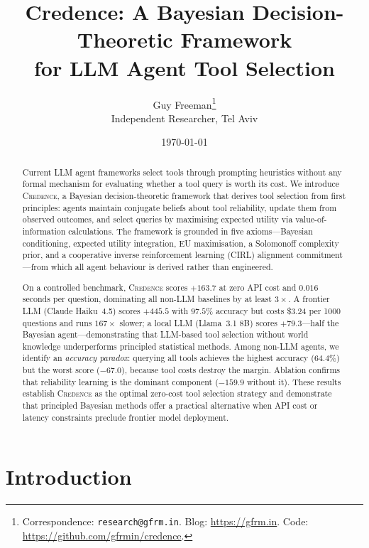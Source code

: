 \documentclass[11pt]{article}
\title{Credence: A Bayesian Decision-Theoretic Framework \\for LLM Agent Tool Selection}
\author{
  Guy Freeman\thanks{Correspondence: \texttt{research@gfrm.in}. Blog: \url{https://gfrm.in}. Code: \url{https://github.com/gfrmin/credence}.} \\
  Independent Researcher, Tel Aviv
}
\date{\today}
\newcommand{\credence}{\textsc{Credence}}
\begin{document}
\maketitle

\begin{abstract}
Current LLM agent frameworks select tools through prompting heuristics without any formal mechanism for evaluating whether a tool query is worth its cost. We introduce \credence{}, a Bayesian decision-theoretic framework that derives tool selection from first principles: agents maintain conjugate beliefs about tool reliability, update them from observed outcomes, and select queries by maximising expected utility via value-of-information calculations. The framework is grounded in five axioms---Bayesian conditioning, expected utility integration, EU maximisation, a Solomonoff complexity prior, and a cooperative inverse reinforcement learning (CIRL) alignment commitment---from which all agent behaviour is derived rather than engineered.

On a controlled benchmark, \credence{} scores $+163.7$ at zero API cost and $0.016$ seconds per question, dominating all non-LLM baselines by at least $3\times$. A frontier LLM (Claude Haiku~4.5) scores $+445.5$ with $97.5\%$ accuracy but costs \$3.24 per 1000 questions and runs $167\times$ slower; a local LLM (Llama~3.1 8B) scores $+79.3$---half the Bayesian agent---demonstrating that LLM-based tool selection without world knowledge underperforms principled statistical methods. Among non-LLM agents, we identify an \emph{accuracy paradox}: querying all tools achieves the highest accuracy ($64.4\%$) but the worst score ($-67.0$), because tool costs destroy the margin. Ablation confirms that reliability learning is the dominant component ($-159.9$ without it). These results establish \credence{} as the optimal zero-cost tool selection strategy and demonstrate that principled Bayesian methods offer a practical alternative when API cost or latency constraints preclude frontier model deployment.
\end{abstract}

\section{Introduction}
\label{sec:intro}
\end{document}

